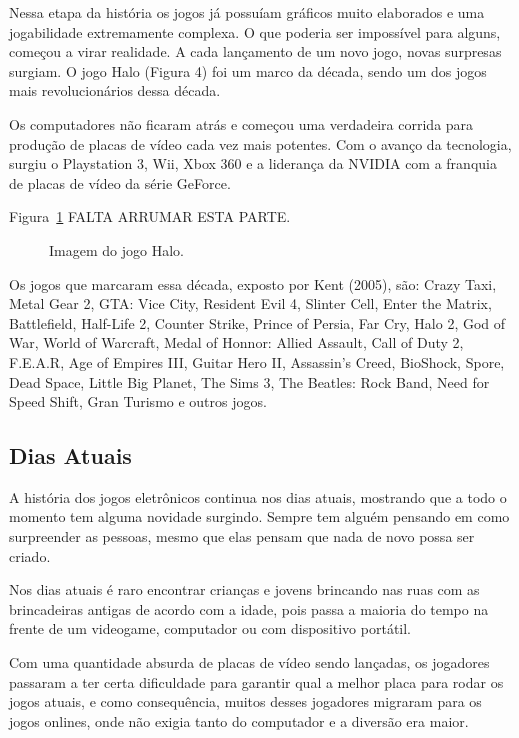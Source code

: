 Nessa etapa da história os jogos já possuíam gráficos muito elaborados e uma jogabilidade extremamente complexa. O que poderia ser impossível para alguns, começou a virar realidade. A cada lançamento de um novo jogo, novas surpresas surgiam.  O jogo Halo (Figura 4) foi um marco da década, sendo um dos jogos mais revolucionários dessa década.

Os computadores não ficaram atrás e começou uma verdadeira corrida para produção de placas de vídeo cada vez mais potentes. Com o avanço da tecnologia, surgiu o Playstation 3, Wii, Xbox 360 e a liderança da NVIDIA com a franquia de placas de vídeo da série GeForce.

Figura~\ref{f1.4} FALTA ARRUMAR ESTA PARTE.
\begin{figure}[!hbp]
\makebox[\textwidth]{\framebox[5cm]{\rule{0pt}{5cm}}}
\caption{Imagem do jogo Halo.} \label{f1.4}
\end{figure}

Os jogos que marcaram essa década, exposto por Kent (2005), são: Crazy Taxi, Metal Gear 2, GTA: Vice City, Resident Evil 4, Slinter Cell, Enter the Matrix, Battlefield, Half-Life 2, Counter Strike, Prince of Persia, Far Cry, Halo 2, God of War, World of Warcraft, Medal of Honnor: Allied Assault, Call of Duty 2, F.E.A.R, Age of Empires III, Guitar Hero II, Assassin’s Creed, BioShock, Spore, Dead Space, Little Big Planet, The Sims 3, The Beatles: Rock Band, Need for Speed Shift, Gran Turismo  e outros jogos.

\subsection{Dias Atuais}

A história dos jogos eletrônicos continua nos dias atuais, mostrando que a todo o momento tem alguma novidade surgindo. Sempre tem alguém pensando em como surpreender as pessoas, mesmo que elas pensam que nada de novo possa ser criado.

Nos dias atuais é raro encontrar crianças e jovens brincando nas ruas com as brincadeiras antigas de acordo com a idade, pois passa a maioria do tempo na frente de um videogame, computador ou com dispositivo portátil. 

Com uma quantidade absurda de placas de vídeo sendo lançadas, os jogadores passaram a ter certa dificuldade para garantir qual a melhor placa para rodar os jogos atuais, e como consequência, muitos desses jogadores migraram para os jogos onlines, onde não exigia tanto do computador e a diversão era maior.

